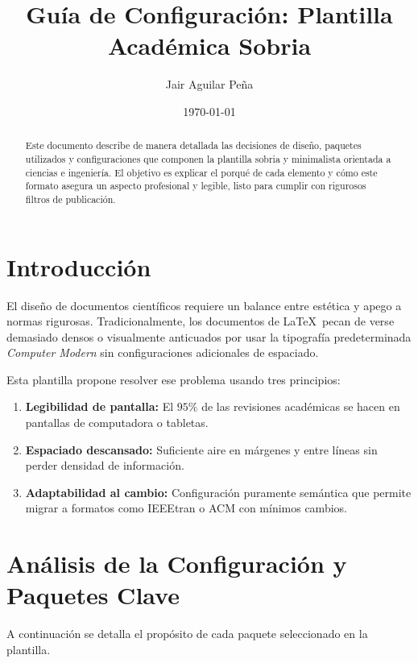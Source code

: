 \documentclass[11pt, a4paper]{article}
\title{\textbf{\color{primary}Guía de Configuración: Plantilla Académica Sobria}}
\author{Jair Aguilar Peña}
\date{\today}
\begin{document}
\maketitle

\begin{abstract}
Este documento describe de manera detallada las decisiones de diseño, paquetes utilizados y configuraciones que componen la plantilla sobria y minimalista orientada a ciencias e ingeniería. El objetivo es explicar el porqué de cada elemento y cómo este formato asegura un aspecto profesional y legible, listo para cumplir con rigurosos filtros de publicación.
\end{abstract}

\section{Introducción}
El diseño de documentos científicos requiere un balance entre estética y apego a normas rigurosas. Tradicionalmente, los documentos de \LaTeX\ pecan de verse demasiado densos o visualmente anticuados por usar la tipografía predeterminada \textit{Computer Modern} sin configuraciones adicionales de espaciado.

Esta plantilla propone resolver ese problema usando tres principios:
\begin{enumerate}
    \item \textbf{Legibilidad de pantalla:} El $95\%$ de las revisiones académicas se hacen en pantallas de computadora o tabletas.
    \item \textbf{Espaciado descansado:} Suficiente aire en márgenes y entre líneas sin perder densidad de información.
    \item \textbf{Adaptabilidad al cambio:} Configuración puramente semántica que permite migrar a formatos como IEEEtran o ACM con mínimos cambios.
\end{enumerate}

\section{Análisis de la Configuración y Paquetes Clave}
A continuación se detalla el propósito de cada paquete seleccionado en la plantilla.
\end{document}
